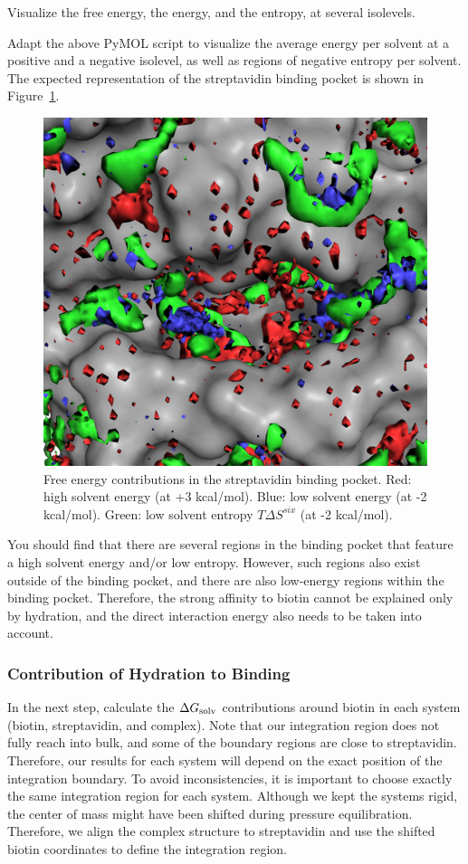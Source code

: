 \documentclass[9pt,tutorial]{livecoms}
\newcommand{\dgsolv}{\Delta G_\textup{solv}}
\begin{document}
Visualize the free energy, the energy, and the entropy, at several isolevels.

Adapt the above PyMOL script to visualize the average energy per solvent at a positive and a negative isolevel, as well as regions of negative entropy per solvent.
The expected representation of the streptavidin binding pocket is shown in Figure~\ref{fig_binding_pocket_pymol}.

\begin{figure}
	\centering
	\includegraphics[width=0.8\linewidth]{figures/binding_pocket_S_-2_E_-2_E_3.png}
	\caption{Free energy contributions in the streptavidin binding pocket. Red: high solvent energy (at +3 kcal/mol). Blue: low solvent energy (at -2 kcal/mol). Green: low solvent entropy $T\Delta S^{six}$ (at -2 kcal/mol).}\label{fig_binding_pocket_pymol}
\end{figure}

You should find that there are several regions in the binding pocket that feature a high solvent energy and/or low entropy.
However, such regions also exist outside of the binding pocket, and there are also low-energy regions within the binding pocket.
Therefore, the strong affinity to biotin cannot be explained only by hydration, and the direct interaction energy also needs to be taken into account.

\subsubsection{Contribution of Hydration to Binding}
In the next step, calculate the $\dgsolv$ contributions around biotin in each system (biotin, streptavidin, and complex).
Note that our integration region does not fully reach into bulk, and some of the boundary regions are close to streptavidin. 
Therefore, our results for each system will depend on the exact position of the integration boundary. 
To avoid inconsistencies, it is important to choose exactly the same integration region for each system.
Although we kept the systems rigid, the center of mass might have been shifted during pressure equilibration.
Therefore, we align the complex structure to streptavidin and use the shifted biotin coordinates to define the integration region.
\end{document}
